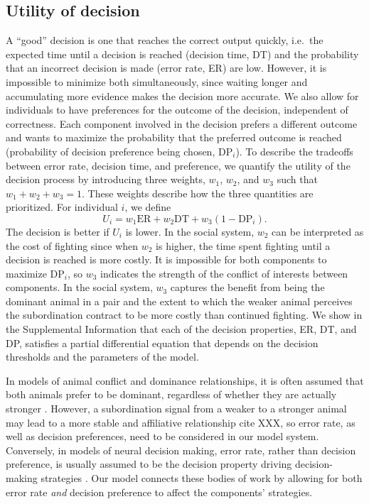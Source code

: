 \documentclass{pnastwo}
\begin{document}
\begin{article}
\subsection{Utility of decision}
A ``good'' decision is one that reaches the correct output quickly, i.e.\ the expected time until a decision is reached (decision time, DT) and the probability that an incorrect decision is made (error rate, ER) are low.  However, it is impossible to minimize both simultaneously, since waiting longer and accumulating more evidence makes the decision more accurate. We also allow for individuals to have preferences for the outcome of the decision, independent of correctness.  Each component involved in the decision prefers a different outcome and wants to maximize the probability that the preferred outcome is reached (probability of decision preference being chosen, $\text{DP}_i$). 
To describe the tradeoffs between error rate, decision time, and preference, we quantify the utility of the decision process by introducing three weights, $w_1$, $w_2$, and $w_3$ such that $w_1+w_2+w_3=1$.  These weights describe how the three quantities are prioritized.  For individual $i$, we define
\begin{equation*}
U_{i}=w_1\text{ER}+w_2\text{DT}+w_3(1-\text{DP}_i).
\end{equation*}
The decision is better if $U_i$ is lower.  
In the social system, $w_2$ can be interpreted as the cost of fighting since when $w_2$ is higher, the time spent fighting until a decision is reached is more costly.  It is impossible for  both components to maximize $\text{DP}_i$, so $w_3$ indicates the strength of the conflict of interests between components. In the social system, $w_3$ captures the benefit from being the dominant animal in a pair and the extent to which the weaker animal perceives the subordination contract to be more costly than continued fighting. We show in the Supplemental Information that each of the decision properties, ER, DT, and DP, satisfies a partial differential equation that depends on the decision thresholds and the parameters of the model. 

In models of animal conflict and dominance relationships, it is often assumed that both animals prefer to be dominant, regardless of whether they are actually stronger \cite{Froment:2010fk, Hemelrijk:2011fk}. However, a subordination signal from a weaker to a stronger animal may lead to a more stable and affiliative relationship cite XXX, so error rate, as well as decision preferences, need to be considered in our model system. Conversely, in models of neural decision making, error rate, rather than decision preference, is usually assumed to be the decision property driving decision-making strategies \cite{Bogacz:2006uq}. Our model connects these bodies of work by allowing for both error rate \emph{and} decision preference to affect the components' strategies. 



\end{article}
\end{document}
